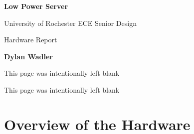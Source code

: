 \documentclass[letterpaper, 11pt, twoside]{article}
\begin{document}
\begin{titlepage}
	\begin{center}

	\vspace*{1cm}
	\Huge
	\textbf{Low Power Server}

	\vspace{0.5cm}
	\LARGE
	University of Rochester ECE Senior Design 

	\vspace{1cm}
	\LARGE
	Hardware Report
	\vspace{1.5cm}
	
	\textbf{Dylan Wadler} 
	\vfill
	
	
	\end{center}
\end{titlepage}
\clearpage

\begin{center}
	This page was intentionally left blank
\end{center}

\clearpage


\tableofcontents
\setcounter{page}{1}
\clearpage

\begin{center}
	This page was intentionally left blank
\end{center}

\clearpage

\section[Overview]{Overview of the Hardware}
\subsection{}
\end{document}
